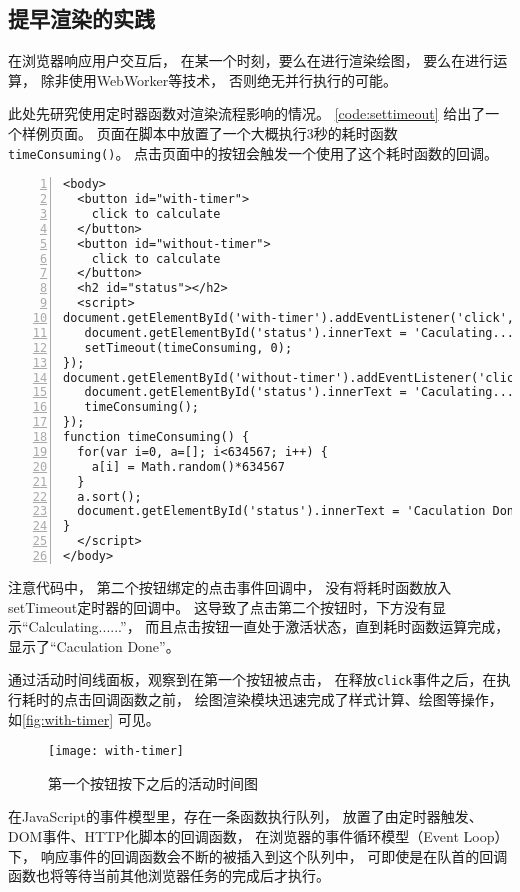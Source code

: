 \subsection{提早渲染的实践}

在浏览器响应用户交互后，
在某一个时刻，要么在进行渲染绘图，
要么在进行运算，
除非使用WebWorker等技术，
否则绝无并行执行的可能。

此处先研究使用定时器函数对渲染流程影响的情况。
\autoref{code:settimeout} 给出了一个样例页面。
页面在脚本中放置了一个大概执行3秒的耗时函数\texttt{timeConsuming()}。
点击页面中的按钮会触发一个使用了这个耗时函数的回调。

\begin{lstlisting}[numbers=left,numberstyle=\tiny,label=code:settimeout,xleftmargin=2em,aboveskip=1em]
<body>
  <button id="with-timer">
    click to calculate
  </button>
  <button id="without-timer">
    click to calculate
  </button>
  <h2 id="status"></h2>
  <script>
document.getElementById('with-timer').addEventListener('click', function(){
   document.getElementById('status').innerText = 'Caculating......';
   setTimeout(timeConsuming, 0);
});
document.getElementById('without-timer').addEventListener('click', function(){
   document.getElementById('status').innerText = 'Caculating......';
   timeConsuming();
});
function timeConsuming() {
  for(var i=0, a=[]; i<634567; i++) {
    a[i] = Math.random()*634567
  }
  a.sort();
  document.getElementById('status').innerText = 'Caculation Done'
}
  </script>
</body>
\end{lstlisting}

注意代码中，
第二个按钮绑定的点击事件回调中，
没有将耗时函数放入setTimeout定时器的回调中。
这导致了点击第二个按钮时，下方没有显示``Calculating......''，
而且点击按钮一直处于激活状态，直到耗时函数运算完成，
显示了``Caculation Done''。

通过活动时间线面板，观察到在第一个按钮被点击，
在释放\texttt{click}事件之后，在执行耗时的点击回调函数之前，
绘图渲染模块迅速完成了样式计算、绘图等操作，
如\autoref{fig:with-timer} 可见。

\begin{figure}[htbp]
	\centering
	\texttt{[image: with-timer]}
	\caption{第一个按钮按下之后的活动时间图}\label{fig:with-timer}
\end{figure}

在JavaScript的事件模型里，存在一条函数执行队列，
放置了由定时器触发、DOM事件、HTTP化脚本的回调函数，
在浏览器的事件循环模型（Event Loop）下，
响应事件的回调函数会不断的被插入到这个队列中，
可即使是在队首的回调函数也将等待当前其他浏览器任务的完成后才执行。

